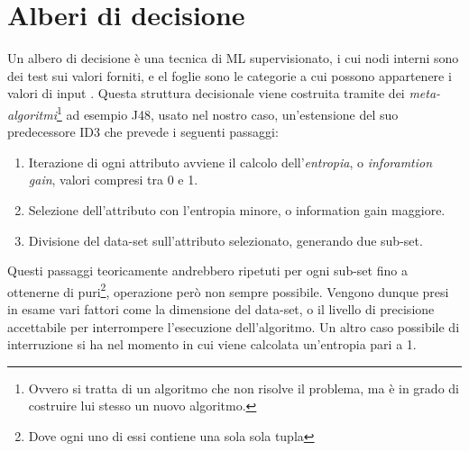 \section{Alberi di decisione} 
Un albero di decisione è una tecnica di ML supervisionato, i cui nodi interni sono dei test sui valori forniti, e el foglie sono le categorie a cui possono appartenere i valori di input \cite{Nilsson96introductionto}.
Questa struttura decisionale viene costruita tramite dei \emph{meta-algoritmi}\footnote{Ovvero si tratta di un algoritmo che non risolve il problema, ma è in grado di costruire lui stesso un nuovo algoritmo.} ad esempio J48, usato nel nostro caso, un'estensione del suo predecessore ID3 che prevede i seguenti passaggi:
\begin{enumerate}
	\item Iterazione di ogni attributo avviene il calcolo dell'\emph{entropia}, o \emph{inforamtion gain}, valori compresi tra 0 e 1.
	\item Selezione dell'attributo con l'entropia minore, o information gain maggiore.
	\item Divisione del data-set sull'attributo selezionato, generando due sub-set.
\end{enumerate}
Questi passaggi teoricamente andrebbero ripetuti per ogni sub-set fino a ottenerne di puri\footnote{Dove ogni uno di essi contiene una sola sola tupla}, operazione però non sempre possibile. Vengono dunque presi in esame vari fattori come la dimensione del data-set, o il livello di precisione accettabile per interrompere l'esecuzione dell'algoritmo. Un altro caso possibile di interruzione si ha nel momento in cui viene calcolata un'entropia pari a 1.

